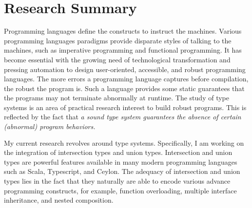 \section{Research Summary}
Programming languages define the constructs to instruct the machines.
Various programming languages paradigms provide disparate styles of talking to the machines,
such as imperative programming and functional programming. It has become essential
with the growing need of technological
transformation and pressing automation to design user-oriented, accessible,
and robust programming
languages. The more errors a programming language captures before compilation,
the robust the
program is. Such a language provides some static guarantees that the programs may not 
terminate abnormally at runtime. The study of type systems is an area of practical research
interest to build robust
programs. This is reflected by the fact that \emph{a sound type system guarantees
the absence of certain (abnormal) program behaviors.}

My current research revolves around type systems. Specifically, I am working on the
integration of intersection types and union types. Intersection and union types are
powerful features available in many
modern programming languages such as Scala, Typescript, and Ceylon. The adequacy of
intersection
and union types lies in the fact that they naturally are able to encode various advance programming
constructs, for example, function overloading, multiple interface inheritance,
and nested composition.

